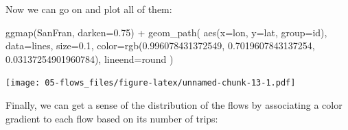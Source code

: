 \documentclass[
]{book}
\newenvironment{Shaded}{\begin{snugshade}}{\end{snugshade}}
\newcommand{\AttributeTok}[1]{\textcolor[rgb]{0.77,0.63,0.00}{#1}}
\newcommand{\FloatTok}[1]{\textcolor[rgb]{0.00,0.00,0.81}{#1}}
\newcommand{\FunctionTok}[1]{\textcolor[rgb]{0.00,0.00,0.00}{#1}}
\newcommand{\NormalTok}[1]{#1}
\newcommand{\SpecialCharTok}[1]{\textcolor[rgb]{0.00,0.00,0.00}{#1}}
\newcommand{\StringTok}[1]{\textcolor[rgb]{0.31,0.60,0.02}{#1}}
\begin{document}
Now we can go on and plot all of them:

\begin{Shaded}
\begin{Highlighting}[]
\FunctionTok{ggmap}\NormalTok{(SanFran, }\AttributeTok{darken=}\FloatTok{0.75}\NormalTok{) }\SpecialCharTok{+} 
  \FunctionTok{geom\_path}\NormalTok{(}
    \FunctionTok{aes}\NormalTok{(}\AttributeTok{x=}\NormalTok{lon, }\AttributeTok{y=}\NormalTok{lat, }\AttributeTok{group=}\NormalTok{id),}
    \AttributeTok{data=}\NormalTok{lines,}
    \AttributeTok{size=}\FloatTok{0.1}\NormalTok{,}
    \AttributeTok{color=}\FunctionTok{rgb}\NormalTok{(}\FloatTok{0.996078431372549}\NormalTok{, }\FloatTok{0.7019607843137254}\NormalTok{, }\FloatTok{0.03137254901960784}\NormalTok{),}
    \AttributeTok{lineend=}\StringTok{\textquotesingle{}round\textquotesingle{}}
\NormalTok{  )}
\end{Highlighting}
\end{Shaded}

\texttt{[image: 05-flows\_files/figure-latex/unnamed-chunk-13-1.pdf]}

Finally, we can get a sense of the distribution of the flows by associating a color gradient to each flow based on its number of trips:

\begin{Shaded}
\end{Shaded}
\end{document}
